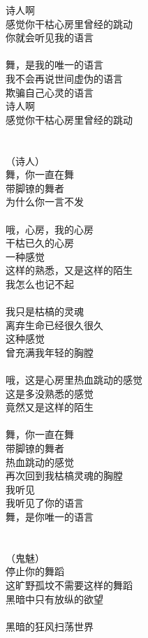 诗人啊\\
感觉你干枯心房里曾经的跳动\\
你就会听见我的语言\\
\\
舞，是我的唯一的语言      \\
我不会再说世间虚伪的语言  \\
欺骗自己心灵的语言        \\
诗人啊                    \\
感觉你干枯心房里曾经的跳动\\
\\
\\
（诗人）\\
舞，你一直在舞\\
带脚镣的舞者\\
为什么你一言不发\\
\\
哦，心房，我的心房\\
干枯已久的心房\\
一种感觉\\
这样的熟悉，又是这样的陌生\\
我怎么也记不起\\
\\
我只是枯槁的灵魂\\
离弃生命已经很久很久\\
这种感觉\\
曾充满我年轻的胸膛\\
\\
哦，这是心房里热血跳动的感觉\\
这是多没熟悉的感觉\\
竟然又是这样的陌生\\
\\
舞，你一直在舞\\
带脚镣的舞者\\
热血跳动的感觉\\
再次回到我枯槁灵魂的胸膛\\
我听见\\
我听见了你的语言\\
舞，是你唯一的语言\\
\\
\\
（鬼魅）\\
停止你的舞蹈\\
这旷野孤坟不需要这样的舞蹈\\
黑暗中只有放纵的欲望\\
\\
黑暗的狂风扫荡世界\\
